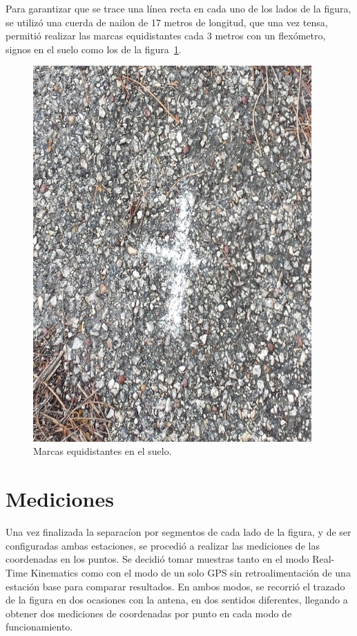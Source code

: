Para garantizar que se trace una línea recta en cada uno de los lados de la figura, se utilizó una cuerda de nailon de 17 metros de longitud, que una vez tensa, permitió realizar las marcas equidistantes cada 3 metros con un flexómetro, signos en el suelo como los de la figura~\ref{fig:MarEq}.

\begin{figure}[H]
\centering
\includegraphics[width=0.95\textwidth]{Figures/Equid}
\caption[Marcas equidistantes en el suelo.]{Marcas equidistantes en el suelo.}
\label{fig:MarEq}
\end{figure}

\section{Mediciones}
Una vez finalizada la separacíon por segmentos de cada lado de la figura, y de ser configuradas ambas estaciones, se procedió a realizar las mediciones de las coordenadas en los puntos. Se decidió tomar muestras tanto en el modo Real-Time Kinematics como con el modo de un solo GPS sin retroalimentación de una estación base para comparar resultados. En ambos modos, se recorrió el trazado de la figura en dos ocasiones con la antena, en dos sentidos diferentes, llegando a obtener dos mediciones de coordenadas por punto en cada modo de funcionamiento.\\

